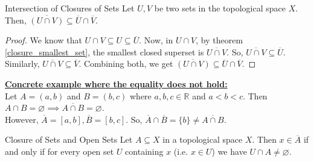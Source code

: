 \begin{Theorem}{Intersection of Closures of Sets}\label{closure_intersection}
    Let $U, V$ be two sets in the topological space $X$. Then, $\overline{(U\cap V)}\subseteq\overline{U}\cap\overline{V}$.
\end{Theorem}
\begin{proof}
    We know that $U\cap V\subseteq U\subseteq\overline{U}$. Now, in $U\cap V$, by theorem \eqref{closure_smallest_set}, the smallest closed superset is $\overline{U\cap V}$. So, $\overline{U\cap V}\subseteq \overline{U}$. Similarly, $\overline{U\cap V}\subseteq\overline{V}$. Combining both, we get $\overline{(U\cap V)}\subseteq\overline{U}\cap\overline{V}$.
\end{proof}
\noindent\underline{\textbf{Concrete example where the equality does not hold:}}\\
Let $A=(a,b)$ and $B=(b,c)$ where $a, b, c\in\mathbb{R}$ and $a<b<c$. Then $A\cap B=\varnothing\implies\overline{A\cap B}=\varnothing$.\\ However, $\overline{A}=[a,b],\overline{B}=[b,c]$. So, $\overline{A}\cap\overline{B}=\{b\}\neq\overline{A\cap B}$.
\begin{Theorem}{Closure of Sets and Open Sets}\label{closure_open_sets}
    Let $A\subseteq X$ in a topological space $X$. Then $x\in\overline{A}$ if and only if for every open set $U$ containing $x$ (i.e. $x\in U$) we have $U\cap A\neq\varnothing$.
\end{Theorem}
